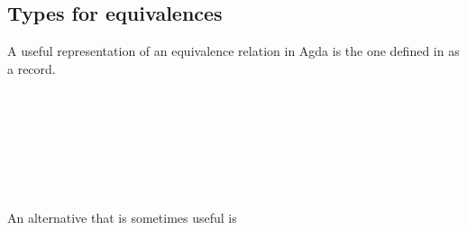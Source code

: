 \documentclass[a4paper,UKenglish,cleveref, autoref, thm-restate]{lipics-v2019}
\begin{document}
\subsection{Types for equivalences}\label{types-for-equivalences}
A useful representation of an equivalence relation in Agda is the one defined in \agdaualib as a record.
\begin{code}\>[0]\AgdaSpace{}%
\AgdaSpace{}%
\>[12]\AgdaSymbol{\{}\AgdaSpace{}%
\AgdaSymbol{:}\AgdaSpace{}%
\AgdaSymbol{\}}\<%
\\
\>[12]\AgdaSymbol{\{}\AgdaSpace{}%
\AgdaSymbol{:}\AgdaSpace{}%
\AgdaSpace{}%
\AgdaSpace{}%
\AgdaSymbol{\}}\<%
\\
\>[12]\AgdaSymbol{(}\AgdaSpace{}%
\AgdaSymbol{:}\AgdaSpace{}%
\AgdaSpace{}%
\AgdaSpace{}%
\AgdaSymbol{)}\AgdaSpace{}%
\AgdaSymbol{:}\AgdaSpace{}%
\AgdaSpace{}%
\AgdaSpace{}%
\AgdaSpace{}%
\AgdaSpace{}%
\<%
\\
\>[0][@{}l@{\AgdaIndent{0}}]%
\>[2]\<%
\\
\>[2][@{}l@{\AgdaIndent{0}}]%
\>[4]%
\>[11]\AgdaSymbol{:}\AgdaSpace{}%
\AgdaSpace{}%
\<%
\\
%
\>[4]%
\>[11]\AgdaSymbol{:}\AgdaSpace{}%
\AgdaSpace{}%
\<%
\\
%
\>[4]\AgdaSpace{}%
\>[11]\AgdaSymbol{:}\AgdaSpace{}%
\AgdaSpace{}%
\<%
\end{code}
An alternative that is sometimes useful is
\end{document}
